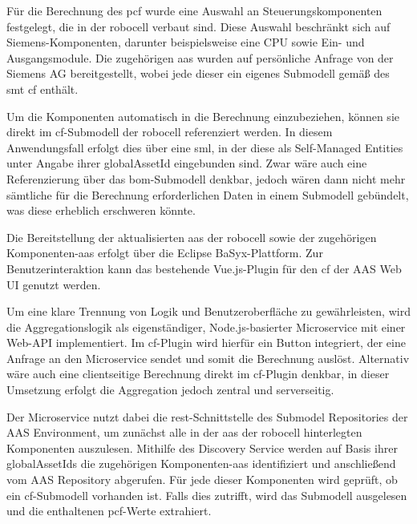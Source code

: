 Für die Berechnung des \acs{pcf} wurde eine Auswahl an Steuerungskomponenten festgelegt, die in der robocell verbaut sind.  
Diese Auswahl beschränkt sich auf Siemens-Komponenten, darunter beispielsweise eine CPU sowie Ein- und Ausgangsmodule.
Die zugehörigen \acs{aas} wurden auf persönliche Anfrage von der Siemens AG bereitgestellt, wobei jede dieser ein eigenes Submodell gemäß des \acs{smt} \acs{cf} enthält.


Um die Komponenten automatisch in die Berechnung einzubeziehen, können sie direkt im \acs{cf}-Submodell der robocell referenziert werden. 
In diesem Anwendungsfall erfolgt dies über eine \acs{sml}, in der diese als Self-Managed Entities unter Angabe ihrer globalAssetId eingebunden sind. 
Zwar wäre auch eine Referenzierung über das \acs{bom}-Submodell denkbar, jedoch wären dann nicht mehr sämtliche für die Berechnung erforderlichen Daten in einem Submodell gebündelt, was diese erheblich erschweren könnte.

Die Bereitstellung der aktualisierten \acs{aas} der robocell sowie der zugehörigen Komponenten-\acs{aas} erfolgt über die Eclipse BaSyx-Plattform.
Zur Benutzerinteraktion kann das bestehende Vue.js-Plugin für den \acs{cf} der AAS Web UI genutzt werden.

Um eine klare Trennung von Logik und Benutzeroberfläche zu gewährleisten, wird die Aggregationslogik als eigenständiger, Node.js-basierter Microservice mit einer Web-API implementiert.
Im \acs{cf}-Plugin wird hierfür ein Button integriert, der eine Anfrage an den Microservice sendet und somit die Berechnung auslöst.
Alternativ wäre auch eine clientseitige Berechnung direkt im \acs{cf}-Plugin denkbar, in dieser Umsetzung erfolgt die Aggregation jedoch zentral und serverseitig.

Der Microservice nutzt dabei die \acs{rest}-Schnittstelle des Submodel Repositories der AAS Environment, um zunächst alle in der \acs{aas} der robocell hinterlegten Komponenten auszulesen. 
Mithilfe des Discovery Service werden auf Basis ihrer globalAssetIds die zugehörigen Komponenten-\acs{aas} identifiziert und anschließend vom AAS Repository abgerufen.
Für jede dieser Komponenten wird geprüft, ob ein \acs{cf}-Submodell vorhanden ist. 
Falls dies zutrifft, wird das Submodell ausgelesen und die enthaltenen \acs{pcf}-Werte extrahiert.

